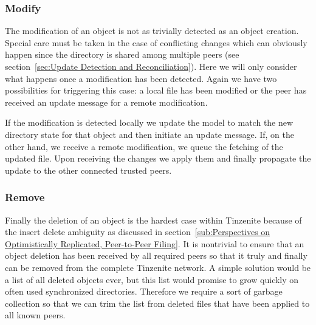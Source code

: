 \subsubsection{Modify}
\label{subs:Modify}

The modification of an object is not as trivially detected as an object creation.
Special care must be taken in the case of conflicting changes which can obviously happen since the directory is shared among multiple peers (see section~\ref{sec:Update Detection and Reconciliation}).
Here we will only consider what happens once a modification has been detected.
Again we have two possibilities for triggering this case: a local file has been modified or the peer has received an update message for a remote modification.

If the modification is detected locally we update the model to match the new directory state for that object and then initiate an update message.
If, on the other hand, we receive a remote modification, we queue the fetching of the updated file.
Upon receiving the changes we apply them and finally propagate the update to the other connected trusted peers.

\subsubsection{Remove}
\label{subs:Remove}

Finally the deletion of an object is the hardest case within Tinzenite because of the insert delete ambiguity as discussed in section~\ref{sub:Perspectives on Optimistically Replicated, Peer-to-Peer Filing}.
It is nontrivial to ensure that an object deletion has been received by all required peers so that it truly and finally can be removed from the complete Tinzenite network.
A simple solution would be a list of all deleted objects ever, but this list would promise to grow quickly on often used synchronized directories.
Therefore we require a sort of garbage collection so that we can trim the list from deleted files that have been applied to all known peers.

